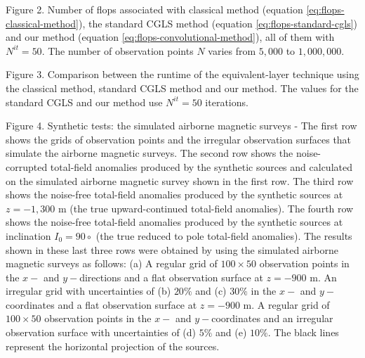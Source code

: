 \documentclass[manuscript,noblind]{geophysics}
\begin{document}

{
	{Figure 2. Number of flops associated with classical method (equation \ref{eq:flops-classical-method}), the standard CGLS method (equation \ref{eq:flops-standard-cgls}) and our method (equation \ref{eq:flops-convolutional-method}), all of them with $N^{it} = 50$. The number of observation points $N$ varies from $5,000$ to $1,000,000$.}
	\label{fig:flops}
}

{
	{Figure 3. Comparison between the runtime of the equivalent-layer technique using the classical method, standard CGLS method and our method. The values for the standard CGLS and our method use $N^{it} = 50$ iterations.}
	\label{fig:solve_time}
}


{
	{Figure 4. Synthetic tests: the simulated airborne magnetic surveys  - The first row shows the grids of observation points and the irregular observation surfaces that simulate the airborne magnetic surveys. The second row shows the noise-corrupted total-field anomalies produced by the synthetic sources and calculated on the simulated airborne magnetic survey shown in the first row. The third row shows the  noise-free total-field anomalies produced by the synthetic sources at $z = -1,300$ m (the true upward-continued total-field anomalies).	The fourth row shows the noise-free total-field anomalies produced by the synthetic sources at inclination $I_{0} = 90\circ$ (the true reduced to pole total-field anomalies). The results shown in these last three rows were obtained by using the simulated airborne magnetic surveys as follows: (a) A regular grid of $100 \times 50$ observation points in the $x-$ and $y-$directions and a flat observation surface at $z= -900$ m. An irregular grid with uncertainties of (b) $20\%$ and (c) $30\%$   in the $x-$ and $y-$coordinates and a flat observation surface at $z= - 900$ m. A regular grid  of $100 \times 50$ observation points in the $x-$ and $y-$coordinates and an irregular observation surface with uncertainties of (d) $5\%$ and  (e) $10\%$. The black lines represent the horizontal projection of the sources.}
	\label{fig:synthetic_data_comparison_v2}
}
\end{document}
